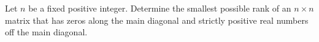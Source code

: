 Let \(n\) be a fixed positive integer. Determine the smallest possible rank of an \(n\times n\) matrix that has zeros along the main diagonal and strictly positive real numbers off the main diagonal.

